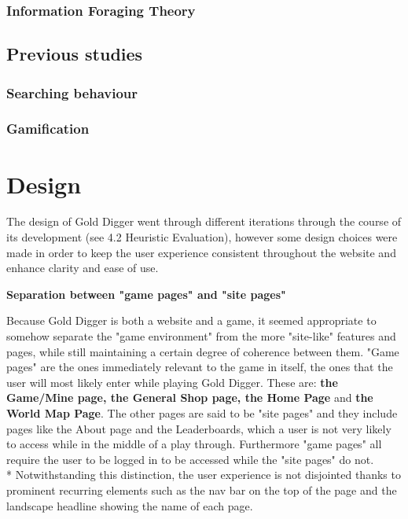 \documentclass{mproj}
\begin{document}
\subsection{Information Foraging Theory}

\section{Previous studies}
\subsection{Searching behaviour}
\subsection{Gamification}

\chapter{Design}\label{design}

The design of Gold Digger went through different iterations through the course of its development (see 4.2 Heuristic Evaluation), however some design choices were made in order to keep the user experience consistent throughout the website and enhance clarity and ease of use.

\textbf{Separation between "game pages" and "site pages"}

Because Gold Digger is both a website and a game, it seemed appropriate to somehow separate the "game environment" from the more "site-like" features and pages, while still maintaining a certain degree of coherence between them. "Game pages" are the ones immediately relevant to the game in itself, the ones that the user will most likely enter while playing Gold Digger. These are: \textbf{the Game/Mine page, the General Shop page, the Home Page} and \textbf{the World Map Page}. The other pages are said to be "site pages" and they include pages like the About page and the Leaderboards, which a user is not very likely to access while in the middle of a play through. Furthermore "game pages" all require the user to be logged in to be accessed while the "site pages" do not. 
\\*
Notwithstanding this distinction, the user experience is not disjointed thanks to prominent recurring elements such as the nav bar on the top of the page and the landscape headline showing the name of each page.
\end{document}

